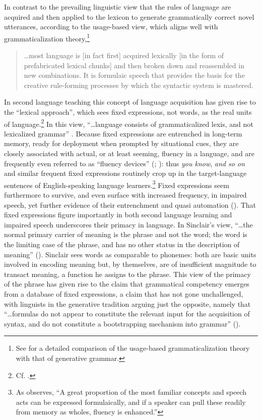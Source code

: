 \documentclass[english,output=paper,colorlinks,citecolor=brown]{../langscibook}
\begin{document}
In contrast to the prevailing linguistic view that the rules of language are acquired and then applied to the lexicon to generate grammatically correct novel utterances, according to the usage-based view, which aligns well with grammaticalization theory,\footnote{See \citet{Christy2010} for a detailed comparison of the usage-based grammaticalization theory with that of generative grammar.}

\begin{quote}
    …most language is [in fact first] acquired lexically [in the form of prefabricated lexical chunks] and then broken down and reassembled in new combinations. It is formulaic speech that provides the basis for the creative rule-forming processes by which the syntactic system is mastered. \citep[174]{MacKenzie2000Improvisation}
\end{quote}

In second language teaching this concept of language acquisition has given rise to the ``lexical approach'', which sees fixed expressions, not words, as the real units of language.\footnote{Cf. \citealt{Lewis1993}.} In this view, “…language consists of grammaticalized lexis, and not lexicalized grammar” \citep[63]{MacKenzie2000Utterances}. Because fixed expressions are entrenched in long-term memory, ready for deployment when prompted by situational cues, they are closely associated with actual, or at least seeming, fluency in a language, and are frequently even referred to as ``fluency devices'' (\citealt[174]{MacKenzie2000Improvisation}; \citealt[3]{Wood2002}): thus \textit{you know}, \textit{and so on} and similar frequent fixed expressions routinely crop up in the target-language sentences of English-speaking language learners.\footnote{As \citet[7]{Wood2002} observes, “A great proportion of the most familiar concepts and speech acts can be expressed formulaically, and if a speaker can pull these readily from memory as wholes, fluency is enhanced.”} Fixed expressions seem furthermore to survive, and even surface with increased frequency, in impaired speech, yet further evidence of their entrenchment and quasi automation (\citealt[xxiv]{GrangerMeunier2008}). That fixed expressions figure importantly in both second language learning and impaired speech underscores their primacy in language. In Sinclair’s view, “…the normal primary carrier of meaning is the phrase and not the word; the word is the limiting case of the phrase, and has no other status in the description of meaning” (\citeyear[409]{Sinclair2008}). Sinclair sees words as comparable to phonemes: both are basic units involved in encoding meaning but, by themselves, are of insufficient magnitude to transact meaning, a function he assigns to the phrase. This view of the primacy of the phrase has given rise to the claim that grammatical competency emerges from a database of fixed expressions, a claim that has not gone unchallenged, with linguists in the generative tradition arguing just the opposite, namely that “…formulas do not appear to constitute the relevant input for the acquisition of syntax, and do not constitute a bootstrapping mechanism into grammar” (\citealt[85]{Bardovi-HarligStringer2017}).
\end{document}
